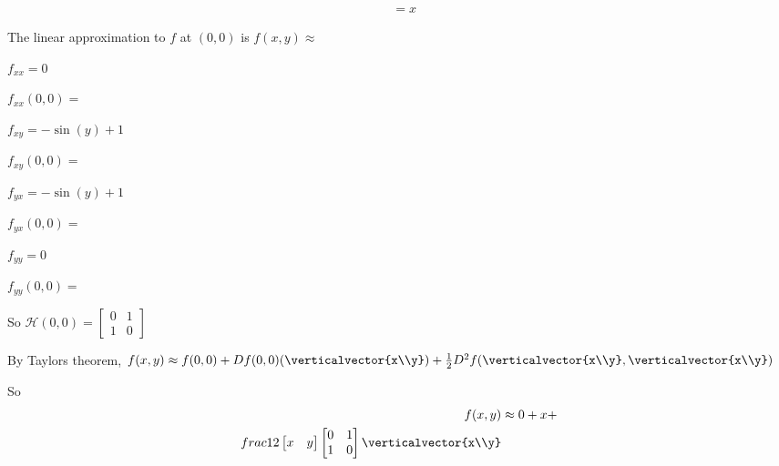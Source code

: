 \documentclass{ximera}
\begin{document}
\begin{question}
\begin{solution}
\begin{hint}
\begin{align*}
						&= x
				\end{align*}
			\end{hint}
			The linear approximation to $f$ at $(0,0)$ is $f(x,y) \approx$ 
		\end{solution}
		\begin{solution}
			\begin{hint}
				\begin{question}
					\begin{solution}
						\begin{hint}
							$f_{xx}= 0$
						\end{hint}
						$f_{xx}(0,0) = $
					\end{solution}
					\begin{solution}
						\begin{hint}
							$f_{xy} = -\sin(y)+1$
						\end{hint}
						$f_{xy}(0,0) = $\answer{1}
					\end{solution}
					\begin{solution}
					\begin{hint}
							$f_{yx} = -\sin(y)+1$
						\end{hint}
						$f_{yx}(0,0) = $
					\end{solution}
					\begin{solution}
					\begin{hint}
							$f_{yy} = 0$
						\end{hint}
						$f_{yy}(0,0) = $\answer{0}
					\end{solution}
				\end{question}
			\end{hint}
			\begin{hint}
				So \(\mathcal{H}(0,0) = \begin{bmatrix} 0&1 \\ 1&0\end{bmatrix}\)
			\end{hint}
			\begin{hint}
				By Taylors theorem, $f(x,y) \approx f(0,0)+Df(0,0)(\verticalvector{x\\y})+\frac{1}{2}D^2f(\verticalvector{x\\y},\verticalvector{x\\y})$
			\end{hint}
			\begin{hint}
				So \begin{align*}
				f(x,y) &\approx 0+x+\\frac{1}{2}\begin{bmatrix} x & y \end{bmatrix} \begin{bmatrix} 0&1 \\ 1&0\end{bmatrix} \verticalvector{x\\y}\\

\end{align*}
\end{hint}
\end{solution}
\end{question}
\end{document}
